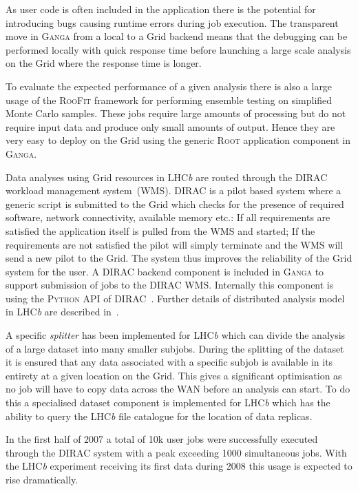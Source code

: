\documentclass{elsart}
\def\lhcb {LHC{\em b\/}\xspace}
\def\dirac{DIRAC\xspace}
\def\ganga {\textsc{Ganga}\xspace}
\def\python {\textsc{Python}\xspace}
\def\root {\textsc{Root}\xspace}
\def\grid {Grid\xspace}
\def\roofit{\textsc{RooFit}\xspace}
\begin{document}
As user code is often included in the application there is the potential for
introducing bugs causing runtime errors during job execution. The transparent
move in \ganga from a local to a \grid backend means that the debugging can be
performed locally with quick response time before launching a large scale
analysis on the \grid where the response time is longer.

To evaluate the expected performance of a given analysis there is also a large
usage of the \roofit \cite{RooFit} framework for performing ensemble testing on simplified
Monte Carlo samples. These jobs require large amounts of processing but do not require
input data and produce only small amounts of output. Hence they are
very easy to deploy on the \grid using the generic \root application component
in \ganga.

Data analyses using \grid resources in \lhcb are routed through the
\dirac~\cite{DIRAC} workload management system~(WMS). \dirac is a pilot based
system where a generic script is submitted to the \grid which checks for the
presence of required software, network connectivity, available memory etc.: If
all requirements are satisfied the application itself is pulled from the WMS
and started; If the requirements are not satisfied the pilot will simply
terminate and the WMS will send a new pilot to the \grid. The system thus
improves the reliability of the \grid system for the user. A \dirac backend
component is included in \ganga to support submission of jobs to the \dirac
WMS. Internally this component is using the \python API of
\dirac~\cite{DIRACAPI}.  Further details of distributed analysis model in
\lhcb are described in~\cite{lhcb:2005jj}.

A specific \emph{splitter} has been implemented for \lhcb which can divide the
analysis of a large dataset into many smaller subjobs. During the splitting of
the dataset it is ensured that any data associated with a specific subjob is
available in its entirety at a given location on the \grid. This gives a
significant optimisation as no job will have to copy data across the WAN
before an analysis can start. To do this a specialised dataset component is
implemented for \lhcb which has the ability to query the \lhcb file catalogue
for the location of data replicas.

In the first half of 2007 a total of 10k user jobs were successfully
executed through the \dirac system with a peak exceeding 1000 simultaneous
jobs. With the \lhcb experiment receiving its first data during 2008 this
usage is expected to rise dramatically.
\end{document}
